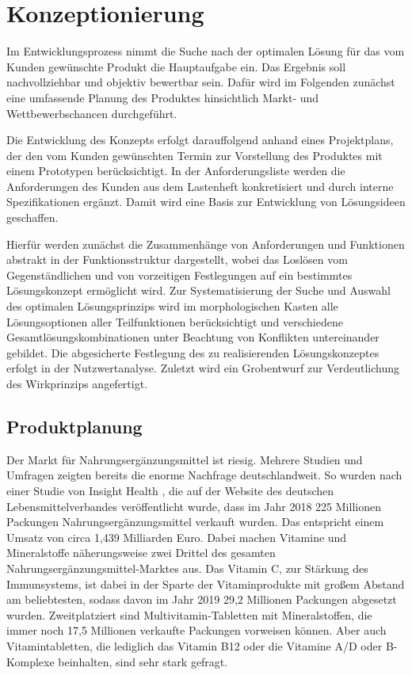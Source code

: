 
\chapter{Konzeptionierung}

Im Entwicklungsprozess nimmt die Suche nach der optimalen Lösung für das vom Kunden gewünschte Produkt die Hauptaufgabe ein. Das Ergebnis soll nachvollziehbar und objektiv bewertbar sein. Dafür wird im Folgenden zunächst eine umfassende Planung des Produktes hinsichtlich Markt- und Wettbewerbschancen durchgeführt.

Die Entwicklung des Konzepts erfolgt darauffolgend anhand eines Projektplans, der den vom Kunden gewünschten Termin zur Vorstellung des Produktes mit einem Prototypen berücksichtigt. In der Anforderungsliste werden die Anforderungen des Kunden aus dem Lastenheft konkretisiert und durch interne Spezifikationen ergänzt. Damit wird eine Basis zur Entwicklung von Lösungsideen geschaffen.

Hierfür werden zunächst die Zusammenhänge von Anforderungen und Funktionen abstrakt in der Funktionsstruktur dargestellt, wobei das Loslösen vom Gegenständlichen und von vorzeitigen Festlegungen auf ein bestimmtes Lösungskonzept ermöglicht wird. Zur Systematisierung der Suche und Auswahl des optimalen Lösungsprinzips wird im morphologischen Kasten alle Lösungsoptionen aller Teilfunktionen berücksichtigt und verschiedene Gesamtlösungskombinationen unter Beachtung von Konflikten untereinander gebildet. Die abgesicherte Festlegung des zu realisierenden Lösungskonzeptes erfolgt in der Nutzwertanalyse. Zuletzt wird ein Grobentwurf zur Verdeutlichung des Wirkprinzips angefertigt.

\section{Produktplanung}
Der Markt für Nahrungsergänzungsmittel ist riesig. Mehrere Studien und Umfragen zeigten bereits die enorme Nachfrage deutschlandweit. So wurden nach einer Studie von Insight Health \cite{LMV}, die auf der Website des deutschen Lebensmittelverbandes veröffentlicht wurde, dass im Jahr 2018 225 Millionen Packungen Nahrungsergänzungsmittel verkauft wurden. Das entspricht einem Umsatz von circa 1,439 Milliarden Euro. Dabei machen Vitamine und Mineralstoffe näherungsweise zwei Drittel des gesamten Nahrungsergänzungsmittel-Marktes aus. Das Vitamin C, zur Stärkung des Immunsystems, ist dabei in der Sparte der Vitaminprodukte mit großem Abstand am beliebtesten, sodass davon im Jahr 2019 29,2 Millionen Packungen abgesetzt wurden. Zweitplatziert sind Multivitamin-Tabletten mit Mineralstoffen, die immer noch 17,5 Millionen verkaufte Packungen vorweisen können. Aber auch Vitamintabletten, die lediglich das Vitamin B12 oder die Vitamine A/D oder B-Komplexe beinhalten, sind sehr stark gefragt.

